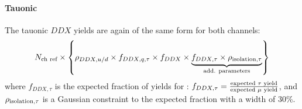 \paragraph{Tauonic}
The tauonic $DDX$ yields are again of the same form for both channels:
\begin{equation}
    N_\text{ch ref} \times \left\{
        \rho_{DDX,u/d} \times f_{DDX,q,\tau} \times f_{DDX} \times
        \underbrace{
            f_{DDX,\tau} \times \rho_\text{isolation,{\ensuremath{\tau}}}
        }_\text{add. parameters}
    \right\}
\end{equation}
where $f_{DDX,\tau}$ is the expected fraction of yields for \tauon:
$f_{DDX,\tau} = \frac{\text{expected \tauon yield}}{\text{expected \muon yield}}$,
and $\rho_\text{isolation,{\ensuremath{\tau}}}$ is a Gaussian constraint to the expected
fraction with a width of 30\%.

